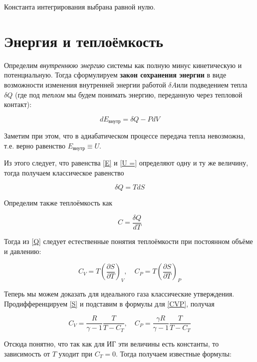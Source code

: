 \documentclass[12pt]{kiarticle}
\newcommand{\del}{\ensuremath{\delta}}
\newcommand{\spdd}[2]{\left( \frac{\partial #1}{\partial #2} \right)}
\begin{document}
Константа интегрирования выбрана равной нулю. 



\section{Энергия и теплоёмкость}

Определим \textit{внутреннюю энергию} системы как полную минус кинетическую и потенциальную. Тогда сформулируем \textbf{закон сохранения энергии} в виде возможности изменения внутренней энергии работой $ \del A $или подведением тепла $ \del Q $  (где под \textit{теплом} мы будем понимать энергию, переданную через тепловой контакт):

\begin{equation}\label{E}
dE_{\text{внутр}} = \del Q - PdV
\end{equation}

Заметим при этом, что в адиабатическом процессе передача тепла невозможна, т.е. верно равенство $ E_{\text{внутр}} \equiv U $.

Из этого следует, что равенства \eqref{E} и \eqref{U =} определяют одну и ту же величину, тогда получаем классическое равенство 

\begin{equation}\label{Q}
\del Q = TdS
\end{equation}

Определим также теплоёмкость как 

\begin{equation}\label{}
C = \dfrac{\del Q}{dT}
\end{equation}

Тогда из \eqref{Q} следует естественные понятия теплоёмкости при постоянном объёме и давлению:

\begin{equation} \label{CVP}
C_V = T \spdd{S}{T}_V, \quad C_P = T \spdd{S}{T}_P
\end{equation} 

Теперь мы можем доказать для идеального газа классические утверждения. Продифференцируем \eqref{S} и подставим в формулы для \eqref{CVP}, получая

\begin{equation}\label{}
C_V = \dfrac{R}{\gamma - 1} \dfrac{T}{T - C_T}, \quad C_P = \dfrac{\gamma R}{\gamma - 1} \dfrac{T}{T - C_T} 
\end{equation}

Отсюда понятно, что так как для ИГ эти величины есть константы, то зависимость от $ T $ уходит при $ C_T = 0 $. Тогда получаем известные формулы:
\end{document}
